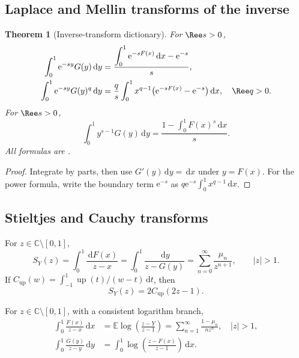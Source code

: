 \documentclass[11pt,oneside]{article}
\newtheorem{theorem}{Theorem}[section]
\theoremstyle{definition}
\theoremstyle{remark}
\newcommand{\Up}{\operatorname{up}}
\newcommand{\E}{\mathbb E}
\newcommand{\C}{\mathbb C}
\newcommand{\dd}{\,\mathrm d}
\newcommand{\e}{\mathrm e}
\newcommand{\1}{\mathbf 1}
\begin{document}
\subsection{Laplace and Mellin transforms of the inverse}

\begin{theorem}[Inverse-transform dictionary]
\label{p7:thm:inverse-transform-dictionary}
For $\Ree s>0$,
\begin{align}
 \int_0^1\e^{-sy}G(y)\dd y
 &=\frac{\displaystyle\int_0^1\e^{-sF(x)}\dd x-\e^{-s}}s,
 \label{p7:eq:inverse-Laplace}\\
 \int_0^1\e^{-sy}G(y)^q\dd y
 &=\frac q s\int_0^1x^{q-1}
 \bigl(\e^{-sF(x)}-\e^{-s}\bigr)\dd x,
 \quad \Ree q>0.\label{p7:eq:inverse-power-Laplace}
\end{align}
For $\Ree s>0$,
\begin{equation}
 \int_0^1y^{s-1}G(y)\dd y
 =\frac{1-\displaystyle\int_0^1F(x)^s\dd x}{s}.
 \label{p7:eq:inverse-Mellin}
\end{equation}
All formulas are \statusproved.
\end{theorem}

\begin{proof}
Integrate by parts, then use $G'(y)\dd y=\dd x$ under $y=F(x)$.  For the power formula,
write the boundary term $\e^{-s}$ as
$q\e^{-s}\int_0^1x^{q-1}\dd x$.
\end{proof}

\subsection{Stieltjes and Cauchy transforms}

\begin{proposition}
\label{p7:prop:Stieltjes}
For $z\in\C\setminus[0,1]$,
\begin{equation}
 S_Y(z)=\int_0^1\frac{\dd F(x)}{z-x}
 =\int_0^1\frac{\dd y}{z-G(y)}
 =\sum_{n=0}^{\infty}\frac{\mu_n}{z^{n+1}},\qquad |z|>1.
 \label{p7:eq:Stieltjes-Y}
\end{equation}
If
$C_{\Up}(w)=\int_{-1}^{1}\Up(t)/(w-t)\dd t$, then
\begin{equation}
 S_Y(z)=2C_{\Up}(2z-1).
 \label{p7:eq:Stieltjes-up}
\end{equation}
\end{proposition}

\begin{proposition}
\label{p7:prop:ordinary-Cauchy}
For $z\in\C\setminus[0,1]$, with a consistent logarithm branch,
\begin{align}
 \int_0^1\frac{F(x)}{z-x}\dd x
 &=\E\log\!\left(\frac{z-Y}{z-1}\right)
 =\sum_{n=1}^{\infty}\frac{1-\mu_n}{nz^n},\quad |z|>1,
 \label{p7:eq:Cauchy-F}\\
 \int_0^1\frac{G(y)}{z-y}\dd y
 &=\int_0^1\log\!\left(\frac{z-F(x)}{z-1}\right)\dd x.
 \label{p7:eq:Cauchy-G}
\end{align}
\end{proposition}
\end{document}
